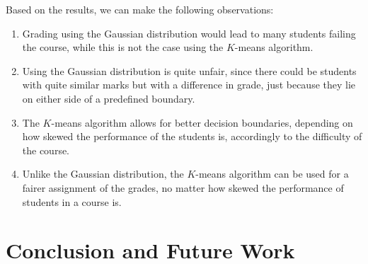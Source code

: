 \documentclass[conference]{IEEEtran}
\begin{document}
Based on the results, we can make the following observations:
\begin{enumerate}
    \item Grading using the Gaussian distribution would lead to many students
    failing the course, while this is not the case using the $K$-means
    algorithm.
    \item Using the Gaussian distribution is quite unfair, since there could
    be students with quite similar marks but with a difference in grade, just
    because they lie on either side of a predefined boundary.
    \item The $K$-means algorithm allows for better decision boundaries,
    depending on how skewed the performance of the students is, accordingly
    to the difficulty of the course.
    \item Unlike the Gaussian distribution, the $K$-means algorithm can be
    used for a fairer assignment of the grades, no matter how skewed the 
    performance of students in a course is.
\end{enumerate}

\section{Conclusion and Future Work}
\label{sec:conclusion}

\nocite{*}


\end{document}
